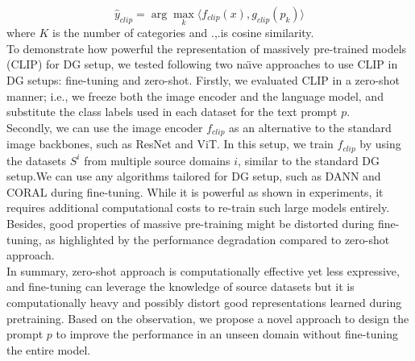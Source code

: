 \documentclass[11pt,twocolumn]{article}
\begin{document}
\begin{equation}
\label{eq:equation2}
    \hat{y}_{clip}=\arg \max_k \langle f_{clip}(x),g_{clip}(p_k)\rangle
\end{equation}
where $K$ is the number of categories and \textlangle.,.\textrangle is cosine similarity.\\
\hspace{1cm} To demonstrate how powerful the representation of massively pre-trained models (CLIP) for DG setup, we tested following two na\"{\i}ve approaches to use CLIP in DG setups: fine-tuning and zero-shot. Firstly, we evaluated CLIP in a zero-shot manner; i.e., we freeze both the image encoder and the language model, and substitute the class labels used in each dataset for the text prompt $p$.\\
\hspace{1cm} Secondly, we can use the image encoder $f_{clip}$ as an alternative to the standard image backbones, such as ResNet and ViT. In this setup, we train $f_{clip}$ by using the datasets $S^i$ from multiple source domains $i$, similar to the standard DG setup.We can use any algorithms tailored for DG setup, such as DANN and CORAL during fine-tuning. While it is powerful as shown in experiments, it requires additional computational costs to re-train such large models entirely. Besides, good properties of massive pre-training might be distorted
during fine-tuning, as highlighted by the performance degradation compared to zero-shot approach.\\
\hspace{1cm}
In summary, zero-shot approach is computationally effective yet less expressive, and fine-tuning can leverage the knowledge of source datasets but it is computationally heavy and possibly distort good representations learned during pretraining. Based on the observation, we propose a novel approach to design the prompt $p$ to improve the performance in an unseen domain without fine-tuning the entire model.
\end{document}

